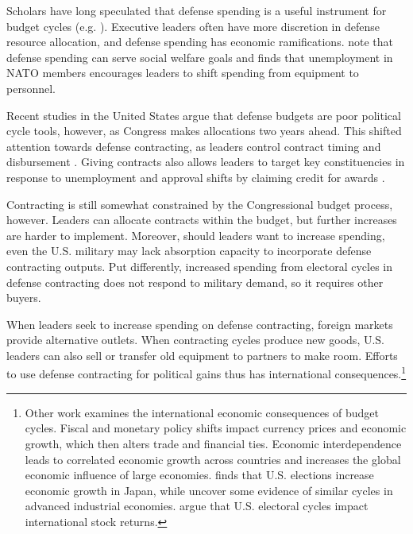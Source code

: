 \documentclass[12pt]{article}
\begin{document}
Scholars have long speculated that defense spending is a useful instrument for budget cycles (e.g. \cite{Tufte1978, Mintz1988}).
Executive leaders often have more discretion in defense resource allocation, and defense spending has economic ramifications.
\citet{WhittenWilliams2011} note that defense spending can serve social welfare goals and \citet{Becker2021} finds that unemployment in NATO members encourages leaders to shift spending from equipment to personnel.


Recent studies in the United States argue that defense budgets are poor political cycle tools, however, as Congress makes allocations two years ahead.
This shifted attention towards defense contracting, as leaders control contract timing and disbursement \citep{Mayer1995, DerouenHeo2000}.
Giving contracts also allows leaders to target key constituencies in response to unemployment and approval shifts by claiming credit for awards \citep{DerouenHeo2000}. 


Contracting is still somewhat constrained by the Congressional budget process, however. 
Leaders can allocate contracts within the budget, but further increases are harder to implement. 
Moreover, should leaders want to increase spending, even the U.S. military may lack absorption capacity to incorporate defense contracting outputs.
Put differently, increased spending from electoral cycles in defense contracting does not respond to military demand, so it requires other buyers. 


When leaders seek to increase spending on defense contracting, foreign markets provide alternative outlets.
When contracting cycles produce new goods, U.S. leaders can also sell or transfer old equipment to partners to make room.
Efforts to use defense contracting for political gains thus has international consequences.\footnote{%
Other work examines the international economic consequences of budget cycles.
Fiscal and monetary policy shifts impact currency prices and economic growth, which then alters trade and financial ties. 
Economic interdependence leads to correlated economic growth across countries \citep{ArtisZhang1999, Kayser2006} and increases the global economic influence of large economies. 
\citet{Ito1991} finds that U.S. elections increase economic growth in Japan, while \citet{ThompsonZuk1983} uncover some evidence of similar cycles in advanced industrial economies.
\citet{FoersterSchmitz1997} argue that U.S. electoral cycles impact international stock returns.
}
\end{document}
